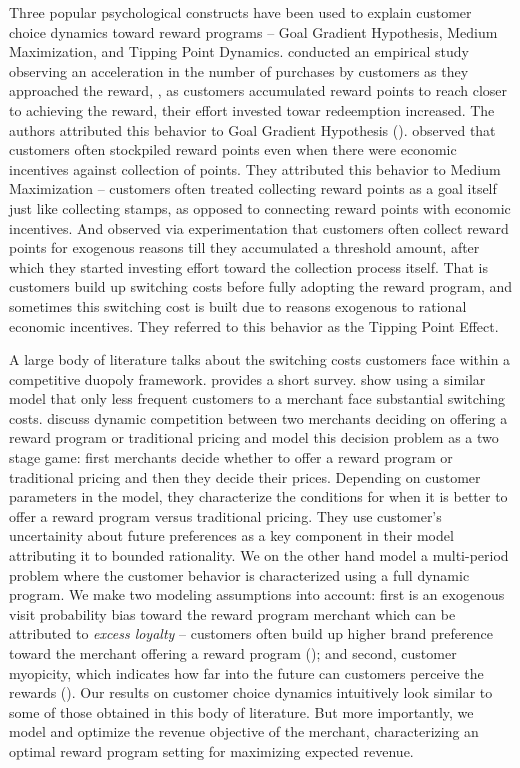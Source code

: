 Three popular psychological constructs have been used to explain customer choice dynamics toward reward programs -- Goal Gradient Hypothesis, Medium Maximization, and Tipping Point Dynamics.
\cite{kivetz2006goal} conducted an empirical study observing an acceleration in the number of purchases by customers as they approached the reward, \ie, as customers accumulated reward points to reach closer to achieving the reward, their effort invested towar redeemption increased. 
The authors attributed this behavior to Goal Gradient Hypothesis (\cite{hull1932goal}).
\cite{stourm2015stockpiling, dreze2004using} observed that customers often stockpiled reward points even when there were economic incentives against collection of points. They attributed this behavior to Medium Maximization -- customers often treated collecting reward points as a goal itself just like collecting stamps, as opposed to connecting reward points with economic incentives.
And \cite{gao2014influence} observed via experimentation that customers often collect reward points for exogenous reasons till they accumulated a threshold amount, after which they started investing effort toward the collection process itself.
That is customers build up switching costs before fully adopting the reward program, and sometimes this switching cost is built due to reasons exogenous to rational economic incentives.
They referred to this behavior as the Tipping Point Effect.

A large body of literature talks about the switching costs customers face within a competitive duopoly framework.
\cite{villas2015short} provides a short survey.
\cite{hartmann2008frequency} show using a similar model that only less frequent customers to a merchant face substantial switching costs.
\cite{kopalle2001economic} discuss dynamic competition between two merchants deciding on offering a reward program or traditional pricing and model this decision problem as a two stage game: first merchants decide whether to offer a reward program or traditional pricing and then they decide their prices. 
Depending on customer parameters in the model, they characterize the conditions for when it is better to offer a reward program versus traditional pricing.
They use customer's uncertainity about future preferences as a key component in their model attributing it to bounded rationality.
We on the other hand model a multi-period problem where the customer behavior is characterized using a full dynamic program.
We make two modeling assumptions into account: first is an exogenous visit probability bias toward the reward program merchant which can be attributed to \emph{excess loyalty} -- customers often build up higher brand preference toward the merchant offering a reward program (\cite{fader1993excess, sharp1997loyalty}); 
and second, customer myopicity, which indicates how far into the future can customers perceive the rewards (\cite{liu2007long,lewis2004influence}).
Our results on customer choice dynamics intuitively look similar to some of those obtained in this body of literature.
But more importantly, we model and optimize the revenue objective of the merchant, characterizing an optimal reward program setting for maximizing expected revenue.
